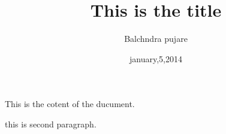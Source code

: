 \documentclass[12pt]{article}
\title{This is the title}
\author{Balchndra pujare}
\date{january,5,2014}
\begin{document}
\maketitle
This is the cotent of the ducument.

this is second paragraph.
\end{document}
